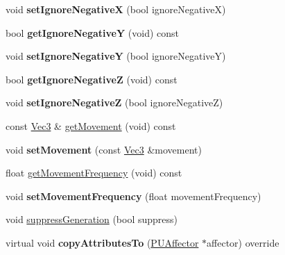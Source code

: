 \begin{DoxyCompactItemize}
void {\bfseries set\+Ignore\+NegativeX} (bool ignore\+NegativeX)
\item 
\mbox{\label{classPUForceFieldAffector_ae045d201d2b2878a945208358916584a}} 
bool {\bfseries get\+Ignore\+NegativeY} (void) const
\item 
\mbox{\label{classPUForceFieldAffector_aab4a317d0ebf00d0a04011d61c15bc85}} 
void {\bfseries set\+Ignore\+NegativeY} (bool ignore\+NegativeY)
\item 
\mbox{\label{classPUForceFieldAffector_ae710c9e66ec8cf31be6849adc880a8de}} 
bool {\bfseries get\+Ignore\+NegativeZ} (void) const
\item 
\mbox{\label{classPUForceFieldAffector_a884af5ed35a5eba03693bfe320b241b4}} 
void {\bfseries set\+Ignore\+NegativeZ} (bool ignore\+NegativeZ)
\item 
const \hyperlink{classVec3}{Vec3} \& \hyperlink{classPUForceFieldAffector_a51dc2e241f92d6cb5ac3f259432afef7}{get\+Movement} (void) const
\item 
\mbox{\label{classPUForceFieldAffector_acebcf5e74b25d588e26ee94e3bc5c6ae}} 
void {\bfseries set\+Movement} (const \hyperlink{classVec3}{Vec3} \&movement)
\item 
float \hyperlink{classPUForceFieldAffector_a208862ee82ecc2a325246ec84047ce80}{get\+Movement\+Frequency} (void) const
\item 
\mbox{\label{classPUForceFieldAffector_a6e7290c6b426621729a5298c1b445dd4}} 
void {\bfseries set\+Movement\+Frequency} (float movement\+Frequency)
\item 
void \hyperlink{classPUForceFieldAffector_ab9dd939076aa4e946bc9e7a26248e360}{suppress\+Generation} (bool suppress)
\item 
\mbox{\label{classPUForceFieldAffector_a76e0d68bfbe363fa60235ba6d23a84ad}} 
virtual void {\bfseries copy\+Attributes\+To} (\hyperlink{classPUAffector}{P\+U\+Affector} $\ast$affector) override
\end{DoxyCompactItemize}
